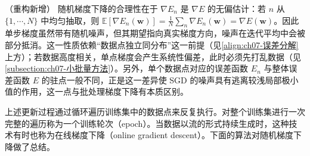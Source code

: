 \documentclass[../../main.tex]{subfiles}
\begin{document}
\begin{remark}（重构新增）
随机梯度下降的合理性在于 $\nabla E_n$ 是 $\nabla E$ 的无偏估计：若 $n$ 从 $\{1,\cdots,N\}$ 中均匀抽取，则 $\mathbb{E}[\nabla E_n(\mathbf{w})]=\frac{1}{N}\sum_n\nabla E_n(\mathbf{w})=\nabla E(\mathbf{w})$。因此单步梯度虽然带有随机噪声，但其期望指向真实梯度方向，噪声在迭代平均中会被部分抵消。这一性质依赖“数据点独立同分布”这一前提（见\eqref{align:ch07-误差分解}上方）；若数据高度相关，单点梯度会产生系统性偏差，此时必须先打乱数据（见\cref{subsection:ch07-小批量方法}）。另外，单个数据点对应的误差函数 $E_n$ 与整体误差函数 $E$ 的驻点一般不同，正是这一差异使 SGD 的噪声具有逃离较浅局部极小值的作用，这一点与批处理梯度下降有本质区别。
\end{remark}

上述更新过程通过循环遍历训练集中的数据点来反复执行。对整个训练集进行一次完整的遍历称为一个训练轮次（epoch）。当数据以流的形式持续生成时，这种技术有时也称为在线梯度下降（online gradient descent）。下面的算法对随机梯度下降做了总结。

\begin{center}
\setlength{\fboxsep}{7pt}%
\end{center}
\end{document}
